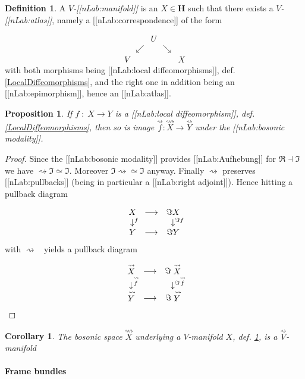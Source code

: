 \documentclass[12pt,titlepage]{article}
\def\mathrlap{\mathpalette\mathrlapinternal}
\def\mathrlapinternal#1#2{\rlap{$\mathsurround=0pt#1{#2}$}}
\newcommand{\itexarray}[1]{\begin{matrix}#1\end{matrix}}
\theoremstyle{plain}
\newtheorem{prop}{Proposition}
\newtheorem{cor}{Corollary}
\theoremstyle{definition}
\newtheorem{defn}{Definition}
\theoremstyle{remark}
\begin{document}
\begin{defn}
\label{VManifold}\hypertarget{VManifold}{}
A \emph{$V$-[[nLab:manifold]]} is an $X \in \mathbf{H}$ such that there exists a \emph{$V$-[[nLab:atlas]]}, namely a [[nLab:correspondence]] of the form

\begin{displaymath}
\itexarray{
    && U
    \\
    & \swarrow && \searrow
    \\
    V && && X
  }
\end{displaymath}
with both morphisms being [[nLab:local diffeomorphisms]], def. \ref{LocalDiffeomorphisms}, and the right one in addition being an [[nLab:epimorphism]], hence an [[nLab:atlas]].

\end{defn}
\begin{prop}
\label{}\hypertarget{}{}
If $f \;\colon\; X \longrightarrow Y$ is a [[nLab:local diffeomorphism]], def. \ref{LocalDiffeomorphisms}, then so is image $\stackrel{\rightsquigarrow}{f}\colon \stackrel{\rightsquigarrow}{X} \longrightarrow \stackrel{\rightsquigarrow}{Y}$ under the [[nLab:bosonic modality]].

\end{prop}
\begin{proof}
Since the [[nLab:bosonic modality]] provides [[nLab:Aufhebung]] for $\Re\dashv \Im$ we have $\rightsquigarrow \Im \simeq \Im$. Moreover $\Im \rightsquigarrow \simeq \Im$ anyway. Finally $\rightsquigarrow$ preserves [[nLab:pullbacks]] (being in particular a [[nLab:right adjoint]]). Hence hitting a pullback diagram

\begin{displaymath}
\itexarray{
    X &\longrightarrow& \Im X
    \\
    \downarrow^{\mathrlap{f}} && \downarrow^{\mathrlap{\Im f}}
    \\
    Y &\longrightarrow& \Im Y
  }
\end{displaymath}
with $\rightsquigarrow\;\;$ yields a pullback diagram

\begin{displaymath}
\itexarray{
    \stackrel{\rightsquigarrow}{X} &\longrightarrow& \Im \stackrel{\rightsquigarrow}{X}
    \\
    \downarrow^{\mathrlap{\stackrel{\rightsquigarrow}{f}}} && \downarrow^{\mathrlap{\Im \stackrel{\rightsquigarrow}{f}}}
    \\
    \stackrel{\rightsquigarrow}{Y} &\longrightarrow& \Im \stackrel{\rightsquigarrow}{Y}
  }
\end{displaymath}
\end{proof}
\begin{cor}
\label{}\hypertarget{}{}
The bosonic space $\stackrel{\rightsquigarrow}{X}$ underlying a $V$-manifold $X$, def. \ref{VManifold}, is a $\stackrel{\rightsquigarrow}{V}$-manifold

\end{cor}
\hypertarget{FrameBundles}{}\paragraph*{{Frame bundles}}\label{FrameBundles}
\end{document}

